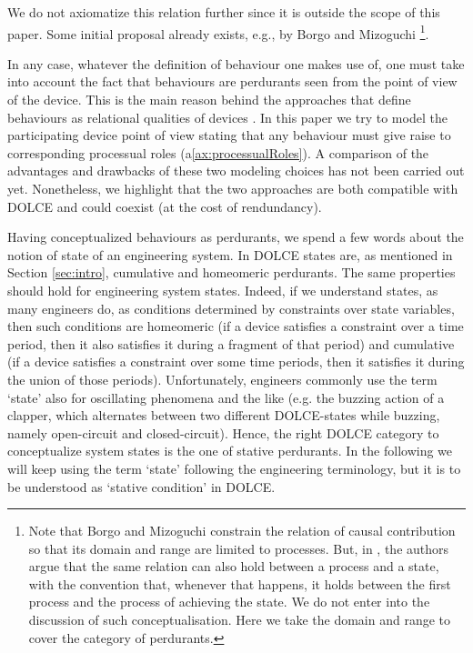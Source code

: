 \documentclass[sw]{iosart2x}
\newcommand{\AxLabel}{\textrm{a}}
\newcommand{\refax}[1]{({\AxLabel}\ref{#1})}
\newcommand{\generalStyle}[1]{\texttt{#1}}
\newcommand{\uniRel}[2]{\generalStyle{#1}(#2)}
\newcommand{\DOLCE}{\textsc{DOLCE}\xspace} %
\newcommand{\DOLCEStative}[1]{\uniRel{{STV}}{#1}}
\newcommand{\quotes}[1]{`#1'}
\begin{document}
We do not axiomatize this relation further since it is outside the scope of this paper. Some initial proposal already exists, e.g., by Borgo and Mizoguchi \cite{borgoFirstorderFormalizationEvent2014}\footnote{Note that Borgo and Mizoguchi constrain the relation of causal contribution so that its domain and range are limited to processes. But, in \cite{mizoguchiUnifyingDefinitionArtifact2016}, the authors argue that the same relation can also hold between a process and a state, with the convention that, whenever that happens, it holds between the first process and the process of achieving the state.
We do not enter into the discussion of such conceptualisation. Here we take the domain and range to cover the category of perdurants.}.

In any case, whatever the definition of behaviour one makes use of, one must take into account the fact that behaviours are perdurants seen from the point of view of the device. This is the main reason behind the approaches that define behaviours as relational qualities of devices \cite{borgoFormalOntologicalPerspective2009}. In this paper we try to model the participating device point of view stating that any behaviour must give raise to corresponding processual roles \refax{ax:processualRoles}. A comparison of the advantages and drawbacks of these two modeling choices has not been carried out yet. Nonetheless, we highlight that the two approaches are both compatible with \DOLCE and could coexist (at the cost of rendundancy).


Having conceptualized behaviours as perdurants, we spend a few words about the notion of state of an engineering system.
In \DOLCE states are, as mentioned in Section \ref{sec:intro}, cumulative and homeomeric perdurants.
The same properties should hold for engineering system states.
Indeed, if we understand states, as many engineers do, as conditions determined by constraints over state variables, then such conditions are homeomeric (if a device satisfies a constraint over a time period, then it also satisfies it during a fragment of that period) and cumulative (if a device satisfies a constraint over some time periods, then it satisfies it during the union of those periods).
Unfortunately, engineers commonly use the term \quotes{state} also for oscillating phenomena and the like (e.g. the buzzing action of a clapper, which alternates between two different \DOLCE-states while buzzing, namely open-circuit and closed-circuit). 
Hence, the right \DOLCE category to conceptualize system states is the one of stative perdurants. 
In the following we will keep using the term \quotes{state} following the engineering terminology, but it is to be understood as \quotes{stative condition} in \DOLCE. %
\end{document}
